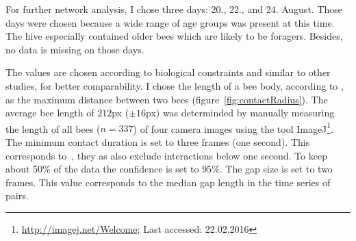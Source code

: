 For further network analysis, I chose three days: 20., 22., and 24. August.
Those days were chosen because a wide range of age groups was present at this time. The hive especially contained older bees which are likely to be foragers. Besides, no data is missing on those days.

The values are chosen according to biological constraints and similar to other studies, for better comparability.
I chose the length of a bee body, according to \textcite{baracchi2014socio}, as the maximum distance between two bees (figure~\ref{fig:contactRadius}). The average bee length of $212$px ($\pm 16$px)  was determinded by manually measuring the length of all bees ($n=337$) of four camera images using the tool ImageJ\footnote{\url{http://imagej.net/Welcome}; Last accessed:
 22.02.2016}.
The minimum contact duration is set to three frames (one second). This corresponds to~\textcite{mersch2013tracking}, they as also exclude interactions below one second.
To keep about 50\% of the data the confidence is set to $95\%$.
The gap size is set to two frames. This value corresponds to the median gap length in the time series of pairs.

